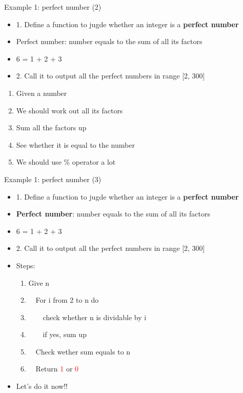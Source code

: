 \begin{frame}[fragile]{Example 1: perfect number (2)}
\begin{itemize}
	\item {1. Define a function to jugde whether an integer is a \textbf{perfect number}}
	\item {Perfect number: number equals to the sum of all its factors}
	\item {6 = 1 + 2 + 3}
	\item {2. Call it to output all the perfect numbers in range [2, 300]}
\end{itemize}
\begin{enumerate}
	\item {Given a number}
	\item {We should work out all its factors}
	\item {Sum all the factors up}
	\item {See whether it is equal to the number}
	\item {We should use \% operator a lot}
\end{enumerate}
\end{frame}

\begin{frame}[fragile]{Example 1: perfect number (3)}
\begin{itemize}
	\item {1. Define a function to jugde whether an integer is a \textbf{perfect number}}
	\item {\textbf{Perfect number}: number equals to the sum of all its factors}
	\item {6 = 1 + 2 + 3}
	\item {2. Call it to output all the perfect numbers in range [2, 300]}
	\item {Steps:}
	\begin{enumerate}
		\item {Give n}
		\item {~~For i from 2 to n do}
		\item {~~~~check whether n is dividable by i}
		\item {~~~~if yes, sum up}
		\item {~~Check wether sum equals to n}
		\item {~~Return \textcolor{red}{1} or \textcolor{red}{0}}
	\end{enumerate}
	\item {Let's do it now!!}
\end{itemize}
\end{frame}

